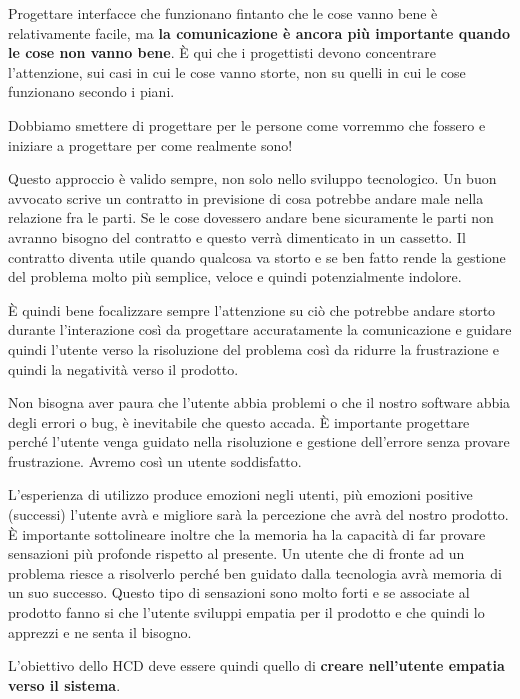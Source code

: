Progettare interfacce che funzionano fintanto che le cose vanno bene è relativamente facile, ma \textbf{la comunicazione è ancora più importante quando le cose non vanno bene}. È qui che i progettisti devono concentrare l'attenzione, sui casi in cui le cose vanno storte, non su quelli in cui le cose funzionano secondo i piani. 


Dobbiamo smettere di progettare per le persone come vorremmo che fossero e iniziare a progettare per come realmente sono!

Questo approccio è valido sempre, non solo nello sviluppo tecnologico. Un buon avvocato scrive un contratto in previsione di cosa potrebbe andare male nella relazione fra le parti. Se le cose dovessero andare bene sicuramente le parti non avranno bisogno del contratto e questo verrà dimenticato in un cassetto. Il contratto diventa utile quando qualcosa va storto e se ben fatto rende la gestione del problema molto più semplice, veloce e quindi potenzialmente indolore. 

È quindi bene focalizzare sempre l'attenzione su ciò che potrebbe andare storto durante l'interazione così da progettare accuratamente la comunicazione e guidare quindi l'utente verso la risoluzione del problema così da ridurre la frustrazione e quindi la negatività verso il prodotto. 

Non bisogna aver paura che l'utente abbia problemi o che il nostro software abbia degli errori o bug, è inevitabile che questo accada. È importante progettare perché l'utente venga guidato nella risoluzione e gestione dell'errore senza provare frustrazione. Avremo così un utente soddisfatto. 

L'esperienza di utilizzo produce emozioni negli utenti, più emozioni positive (successi) l'utente avrà e migliore sarà la percezione che avrà del nostro prodotto. È importante sottolineare inoltre che la memoria ha la capacità di far provare sensazioni più profonde rispetto al presente. Un utente che di fronte ad un problema riesce a risolverlo perché ben guidato dalla tecnologia avrà memoria di un suo successo. Questo tipo di sensazioni sono molto forti e se associate al prodotto fanno si che l'utente sviluppi empatia per il prodotto e che quindi lo apprezzi e ne senta il bisogno.

L'obiettivo dello HCD deve essere quindi quello di \textbf{creare nell'utente empatia verso il sistema}.


